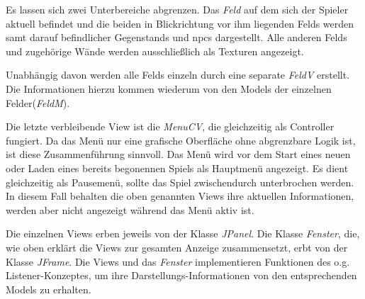 Es lassen sich zwei Unterbereiche abgrenzen. Das \textit{Feld} auf dem sich der \gls{Spieler} aktuell befindet und die beiden
in \gls{Blickrichtung} vor ihm liegenden \glspl{Feld} werden samt darauf befindlicher \glspl{Gegenstand} und \gls{npcs} dargestellt.
Alle anderen \glspl{Feld} und zugehörige Wände werden ausschließlich als Texturen angezeigt.

Unabhängig davon werden alle \glspl{Feld} einzeln durch eine separate \textit{FeldV} erstellt. Die Informationen hierzu 
kommen wiederum von den Models der einzelnen Felder(\textit{FeldM}).

Die letzte verbleibende View ist die \textit{MenuCV}, die gleichzeitig als Controller fungiert. 
Da das Menü nur eine grafische Oberfläche ohne abgrenzbare Logik ist, ist diese Zusammenführung sinnvoll.
Das Menü wird vor dem Start eines neuen oder Laden eines bereits begonennen \gls{Spiel}s als Hauptmenü angezeigt. 
Es dient gleichzeitig als Pausemenü, sollte das \gls{Spiel} zwischendurch unterbrochen werden.
In diesem Fall behalten die oben genannten Views ihre aktuellen Informationen, werden aber nicht angezeigt während
das Menü aktiv ist.

Die einzelnen Views erben jeweils von der Klasse \textit{JPanel}. Die Klasse \textit{Fenster}, die, wie oben erklärt die 
Views zur gesamten \gls{Anzeige} zusammensetzt, erbt von der Klasse \textit{JFrame}.
Die Views und das \textit{Fenster} implementieren Funktionen des o.g. Listener-Konzeptes, um ihre
Darstellungs-Informationen von den entsprechenden Models zu erhalten.

